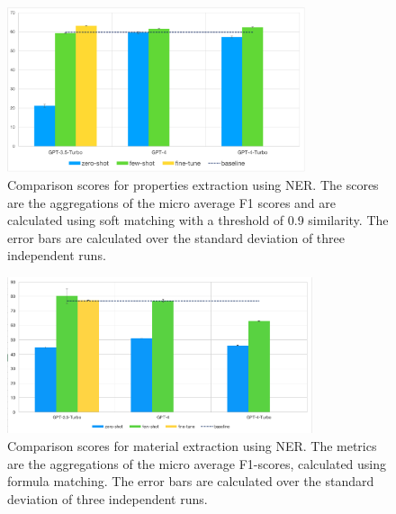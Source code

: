 \begin{figure}[htbp]
  \centering
  \includegraphics[width=0.78\textwidth]{figures/ner-measeval-all.png} 
  \caption{Comparison scores for properties extraction using NER. The scores are the aggregations of the micro average F1 scores and are calculated using soft matching with a threshold of 0.9 similarity. The error bars are calculated over the standard deviation of three independent runs.}
  \label{fig:ner-measeval-all}
\end{figure}

\begin{figure}[htbp]
  \centering
  \includegraphics[width=0.8\textwidth]{figures/ner-supermat-all.png} 
  \caption{Comparison scores for material extraction using NER. The metrics are the aggregations of the micro average F1-scores, calculated using formula matching. The error bars are calculated over the standard deviation of three independent runs.}
  \label{fig:ner-materials-all}
\end{figure}

